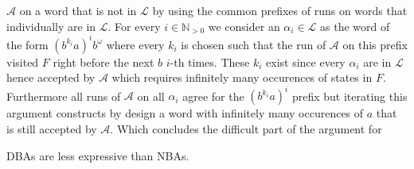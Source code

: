 $\mathcal{A}$ on a word that is not in $\mathcal{L}$ by using the common
prefixes of runs on words that individually are in $\mathcal{L}$. For every
$i\in\mathbb{N}_{>0}$ we consider an $\alpha_{i}\in\mathcal{L}$ as the word of
the form $(b^{k_{i}}a)^{i}b^{\omega}$ where every $k_{i}$ is chosen such that
the run of $\mathcal{A}$ on this prefix visited $F$ right before the next $b$
$i$-th times. These $k_{i}$ exist since every $\alpha_{i}$ are in $\mathcal{L}$
hence accepted by $\mathcal{A}$ which requires infinitely many occurences of
states in $F$. Furthermore all runs of $\mathcal{A}$ on all $\alpha_{i}$ agree
for the $(b^{k_{i}}a)^{i}$ prefix but iterating this argument constructs by
design a word with infinitely many occurences of $a$ that is still accepted by
$\mathcal{A}$. Which concludes the difficult part of the argument for
\begin{proposition}
  \acp{DBA} are less expressive than \acp{NBA}.
  \label{prop:dbalessnba}
\end{proposition}

